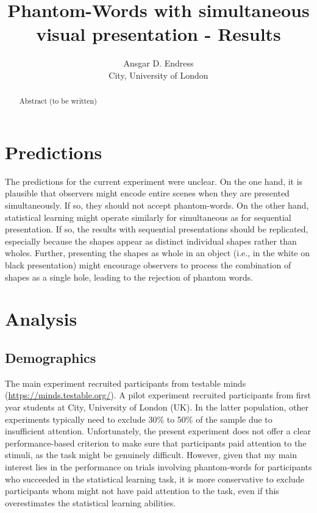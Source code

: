 \documentclass[
]{article}
\title{Phantom-Words with simultaneous visual presentation - Results}
\author{Ansgar D. Endress\\
City, University of London}
\date{}
\begin{document}
\maketitle
\begin{abstract}
Abstract (to be written)
\end{abstract}

\section{Predictions}\label{predictions}

The predictions for the current experiment were unclear. On the one
hand, it is plausible that observers might encode entire scenes when
they are presented simultaneously. If so, they should not accept
phantom-words. On the other hand, statistical learning might operate
similarly for simultaneous as for sequential presentation. If so, the
results with sequential presentations should be replicated, especially
because the shapes appear as distinct individual shapes rather than
wholes. Further, presenting the shapes as whole in an object (i.e., in
the white on black presentation) might encourage observers to process
the combination of shapes as a single hole, leading to the rejection of
phantom words.

\section{Analysis}\label{analysis}

\subsection{Demographics}\label{demographics}

The main experiment recruited participants from testable minds
(\url{https://minds.testable.org/}). A pilot experiment recruited
participants from first year students at City, University of London
(UK). In the latter population, other experiments typically need to
exclude 30\% to 50\% of the sample due to insufficient attention.
Unfortunately, the present experiment does not offer a clear
performance-based criterion to make sure that participants paid
attention to the stimuli, as the task might be genuinely difficult.
However, given that my main interest lies in the performance on trials
involving phantom-words for participants who succeeded in the
statistical learning task, it is more conservative to exclude
participants whom might not have paid attention to the task, even if
this overestimates the statistical learning abilities.
\end{document}
